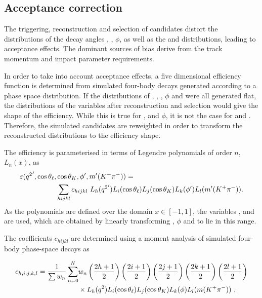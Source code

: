 \subsection{Acceptance correction}
\label{sec:kpimm:acceptance}

The triggering, reconstruction and selection of candidates distort the distributions of the decay angles \ctl, \ctk, $\phi$, as well as the \qsq and \mkpi distributions, leading to acceptance effects. The dominant sources of bias derive from the track momentum and impact parameter requirements. 

In order to take into account acceptance effects, a five dimensional efficiency function is determined from simulated four-body \BdToKpimm decays generated according to a phase space distribution. If the distributions of \qsq, \ctl, \ctk, $\phi$ and \mkpi were all generated flat, the distributions of the variables after reconstruction and selection would give the shape of the efficiency.  While this is true for \ctl, \ctk and $\phi$, it is not the case for \qsq and \mkpi. Therefore, the simulated candidates are reweighted in order to transform the reconstructed distributions to the efficiency shape.

The efficiency is parameterised in terms of Legendre polynomials of order $n$, $L_n(x)$, as
\begin{equation}
\begin{split}
\varepsilon({q^2}',\cos{\theta_\ell},&\cos{\theta_K},\phi',m'({{K}^+}{{\pi}^-})) = \\
& \sum_{hijkl} c_{hijkl}~L_{h}({q^2}')L_{i}(\cos{\theta_\ell})L_{j}(\cos{\theta_K})L_{k}(\phi')L_{l}(m'({{K}^+}{{\pi}^-})).
 \end{split}
 \label{eqn:legendre}
\end{equation}
As the polynomials are defined over the domain $x\in[-1,1]$, the variables \qsqp, \phip and \mkpip are used, which are obtained by linearly transforming \qsq, $\phi$ and \mkpi to lie in this range.

The coefficients $c_{hijkl}$ are determined using a moment analysis of simulated four-body \BdToKpimm phase-space decays as

\begin{equation}
   \begin{split}
     c_{h,i,j,k,l} = \frac{1}{\sum w_{n}}\sum_{n=0}^{N}&w_{n}\left(\frac{2h+1}{2}\right)\left(\frac{2i+1}{2}\right)\left(\frac{2j+1}{2}\right)\left(\frac{2k+1}{2}\right)\left(\frac{2l+1}{2}\right)\\
     &\times L_{h}({q^2})L_{i}(\cos{\theta_\ell})L_{j}(\cos{\theta_K})L_{k}(\phi)L_{l}(m({{K}^+}{{\pi}^-}))~,
     \end{split}
 \end{equation}

